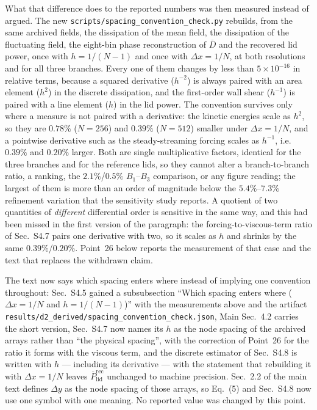 \documentclass[11pt,a4paper]{article}
\begin{document}
What that difference does to the reported numbers was then measured instead of
argued. The new \texttt{scripts/spacing\_convention\_check.py} rebuilds, from the
same archived fields, the dissipation of the mean field, the dissipation of the
fluctuating field, the eight-bin phase reconstruction of $\overline D$ and the
recovered lid power, once with $h=1/(N-1)$ and once with $\Delta x=1/N$, at both
resolutions and for all three branches. Every one of them changes by less than
$5\times10^{-16}$ in relative terms, because a squared derivative ($h^{-2}$) is
always paired with an area element ($h^{2}$) in the discrete dissipation, and the
first-order wall shear ($h^{-1}$) is paired with a line element ($h$) in the lid
power. The convention survives only where a measure is not paired with a
derivative: the kinetic energies scale as $h^{2}$, so they are $0.78\%$
($N=256$) and $0.39\%$ ($N=512$) smaller under $\Delta x=1/N$, and a pointwise
derivative such as the steady-streaming forcing scales as $h^{-1}$, i.e.\ $0.39\%$
and $0.20\%$ larger. Both are single multiplicative factors, identical for the three
branches and for the reference lids, so they cannot alter a branch-to-branch ratio, a
ranking, the
$2.1\%$/$0.5\%$ $B_1$--$B_3$ comparison, or any figure reading; the largest of them
is more than an order of magnitude below the $5.4\%$--$7.3\%$ refinement variation
that the sensitivity study reports. A quotient of two quantities of \emph{different}
differential order is sensitive in the same way, and this had been missed in the first
version of the paragraph: the forcing-to-viscous-term ratio of Sec.~S4.7 pairs one
derivative with two, so it scales as $h$ and shrinks by the same $0.39\%$/$0.20\%$.
Point~26 below reports the measurement of that case and the text that replaces the
withdrawn claim.

The text now says which spacing enters where instead of implying one convention
throughout: Sec.~S4.5 gained a subsubsection ``Which spacing enters where
($\Delta x=1/N$ and $h=1/(N-1)$)'' with the measurements above and the artifact
\texttt{results/d2\_derived/spacing\hspace{0pt}\_convention\_check.json}, Main Sec.~4.2 carries
the short version, Sec.~S4.7 now names its $h$ as the node spacing of the archived
arrays rather than ``the physical spacing'', with the correction of Point~26 for the
ratio it forms with the viscous term, and the
discrete estimator of Sec.~S4.8 is written with $h$ --- including its derivative ---
with the statement that rebuilding it with $\Delta x=1/N$ leaves
$\overline{P}_{\mathrm{lid}}^{\mathrm{rec}}$ unchanged to machine precision. Sec.~2.2
of the main text defines $\Delta y$ as the node spacing of those arrays, so Eq.~(5)
and Sec.~S4.8 now use one symbol with one meaning. No reported value was
changed by this point.
\end{document}
